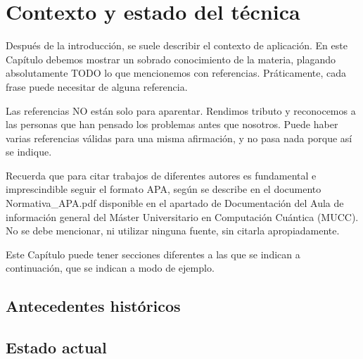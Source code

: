 \chapter{Contexto y estado del técnica}

Después de la introducción, se suele describir el contexto de aplicación. En este Capítulo debemos mostrar un sobrado conocimiento de la materia, plagando absolutamente TODO lo que mencionemos con referencias. Práticamente, cada frase puede necesitar de alguna referencia.

Las referencias NO están solo para aparentar. Rendimos tributo y reconocemos a las personas que han pensado los problemas antes que nosotros. Puede haber varias referencias válidas para una misma afirmación, y no pasa nada porque así se indique.

Recuerda que para citar trabajos de diferentes autores es fundamental e imprescindible seguir el formato APA, según se describe en el documento Normativa\_APA.pdf disponible en el apartado de Documentación del Aula de información general del Máster Universitario en Computación Cuántica (MUCC). No se debe mencionar, ni utilizar ninguna fuente, sin citarla apropiadamente.

Este Capítulo puede tener secciones diferentes a las que se indican a continuación, que se indican a modo de ejemplo.

\section{Antecedentes históricos}

\section{Estado actual}

